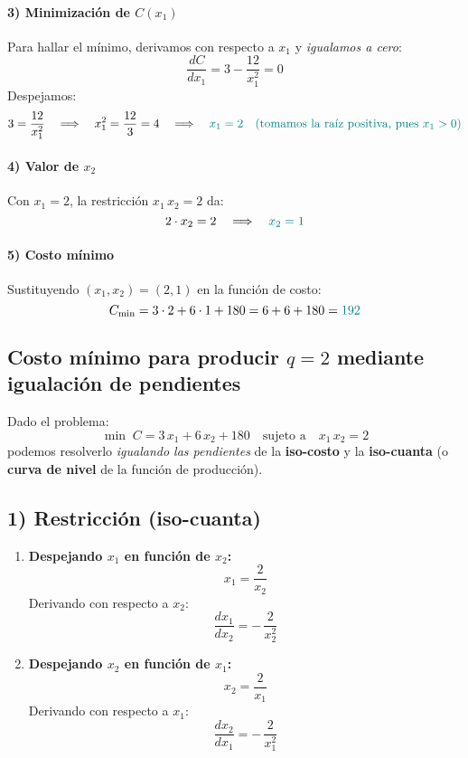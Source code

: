 \documentclass{article}
\begin{document}
\paragraph{3) Minimización de \(C(x_1)\)}

Para hallar el mínimo, derivamos con respecto a \(x_1\) y \emph{igualamos a cero}:
\[
\frac{dC}{dx_1}
= 3 - \frac{12}{x_1^2} = 0
\]
Despejamos:
\[
3 = \frac{12}{x_1^2}
\quad \Longrightarrow \quad
x_1^2 = \frac{12}{3} = 4
\quad \Longrightarrow \quad
\color{teal}{x_1 = 2}
\quad (\text{tomamos la raíz positiva, pues } x_1 > 0)
\]

\paragraph{4) Valor de \(x_2\)}

Con \(x_1 = 2\), la restricción \(x_1 \, x_2 = 2\) da:
\[
2 \cdot x_2 = 2
\quad \Longrightarrow \quad
\color{teal}{x_2 = 1}
\]

\paragraph{5) Costo mínimo}

Sustituyendo \((x_1, x_2) = (2,1)\) en la función de costo:
\[
C_{\min}
= 3\cdot 2 + 6\cdot 1 + 180
= 6 + 6 + 180
= \color{teal}{192}
\]



\bigskip

\subsection*{Costo mínimo para producir \(q = 2\) mediante igualación de pendientes}

Dado el problema:
\[
\min \; C = 3\,x_1 + 6\,x_2 + 180
\quad \text{sujeto a} \quad
x_1\,x_2 = 2
\]
podemos resolverlo \emph{igualando las pendientes} de la \textbf{iso-costo} y la \textbf{iso-cuanta} (o \textbf{curva de nivel} de la función de producción).

\bigskip

\subsection*{1) Restricción (iso-cuanta)}

\begin{enumerate}
    \item \textbf{Despejando \(x_1\) en función de \(x_2\):}
    \[
    x_1 = \frac{2}{x_2}
    \]
    Derivando con respecto a \(x_2\):
    \[
    \frac{dx_1}{dx_2}
    = -\,\frac{2}{x_2^2}
    \]

    \item \textbf{Despejando \(x_2\) en función de \(x_1\):}
    \[
    x_2 = \frac{2}{x_1}
    \]
    Derivando con respecto a \(x_1\):
    \[
    \frac{dx_2}{dx_1}
    = -\,\frac{2}{x_1^2}
    \]
\end{enumerate}
\end{document}
